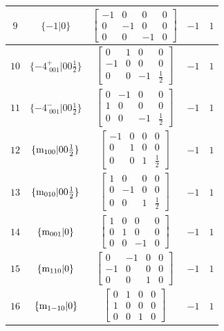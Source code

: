 \documentclass[fleqn,8pt]{jsarticle}
\begin{document}
\begin{longtable}{ccccc}
$ 9 $ & $ \{-1|0\} $ & $ \begin{bmatrix} -1 & 0 & 0 & 0 \\ 0 & -1 & 0 & 0 \\ 0 & 0 & -1 & 0 \end{bmatrix} $ & $ -1 $ & $ 1 $ \\ \hline
$ 10 $ & $ \{-4^{+}_{\,\,001}|0 0 \frac{1}{2}\} $ & $ \begin{bmatrix} 0 & 1 & 0 & 0 \\ -1 & 0 & 0 & 0 \\ 0 & 0 & -1 & \frac{1}{2} \end{bmatrix} $ & $ -1 $ & $ 1 $ \\ \hline
$ 11 $ & $ \{-4^{-}_{\,\,001}|0 0 \frac{1}{2}\} $ & $ \begin{bmatrix} 0 & -1 & 0 & 0 \\ 1 & 0 & 0 & 0 \\ 0 & 0 & -1 & \frac{1}{2} \end{bmatrix} $ & $ -1 $ & $ 1 $ \\ \hline
$ 12 $ & $ \{{\rm m}_{100}|0 0 \frac{1}{2}\} $ & $ \begin{bmatrix} -1 & 0 & 0 & 0 \\ 0 & 1 & 0 & 0 \\ 0 & 0 & 1 & \frac{1}{2} \end{bmatrix} $ & $ -1 $ & $ 1 $ \\ \hline
$ 13 $ & $ \{{\rm m}_{010}|0 0 \frac{1}{2}\} $ & $ \begin{bmatrix} 1 & 0 & 0 & 0 \\ 0 & -1 & 0 & 0 \\ 0 & 0 & 1 & \frac{1}{2} \end{bmatrix} $ & $ -1 $ & $ 1 $ \\ \hline
$ 14 $ & $ \{{\rm m}_{001}|0\} $ & $ \begin{bmatrix} 1 & 0 & 0 & 0 \\ 0 & 1 & 0 & 0 \\ 0 & 0 & -1 & 0 \end{bmatrix} $ & $ -1 $ & $ 1 $ \\ \hline
$ 15 $ & $ \{{\rm m}_{110}|0\} $ & $ \begin{bmatrix} 0 & -1 & 0 & 0 \\ -1 & 0 & 0 & 0 \\ 0 & 0 & 1 & 0 \end{bmatrix} $ & $ -1 $ & $ 1 $ \\ \hline
$ 16 $ & $ \{{\rm m}_{1-10}|0\} $ & $ \begin{bmatrix} 0 & 1 & 0 & 0 \\ 1 & 0 & 0 & 0 \\ 0 & 0 & 1 & 0 \end{bmatrix} $ & $ -1 $ & $ 1 $ \\
\end{longtable}
\end{document}
